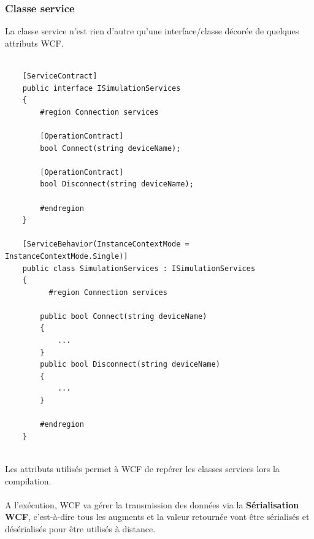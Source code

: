 \documentclass{article}
\begin{document}
\subsubsection{\large Classe service}
La classe service n'est rien d'autre qu'une interface/classe décorée de quelques attributs WCF. 
\begin{lstlisting}[label=Example d'une classe service WCF,caption=Example d'une classe service WCF]
	    
    [ServiceContract]
    public interface ISimulationServices
    {
        #region Connection services
       
        [OperationContract]
        bool Connect(string deviceName);
      
        [OperationContract]
        bool Disconnect(string deviceName); 
      
        #endregion
    }
    
    [ServiceBehavior(InstanceContextMode = InstanceContextMode.Single)]
    public class SimulationServices : ISimulationServices
    {
          #region Connection services

        public bool Connect(string deviceName)
        {
        	...
        }
        public bool Disconnect(string deviceName)
        {
            ...
        } 

        #endregion
    }
\end{lstlisting}
\ \\
Les attributs utilisés permet à WCF de repérer les classes services lors la compilation.
\\\\
A l'exécution, WCF va gérer la transmission des données via la \textbf{Sérialisation WCF}, c'est-à-dire tous les augments et la valeur retournée vont être sérialisés et désérialisés pour être utilisés à distance. 

\vspace{0.2 cm}
\end{document}
